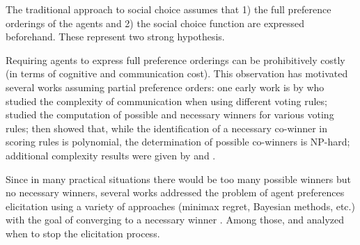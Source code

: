 \documentclass{article}
\begin{document}
The traditional approach to social choice assumes that 1) the full preference orderings of the agents and 2) the social choice function are expressed beforehand. These represent two strong hypothesis.

Requiring agents to express full preference orderings can be prohibitively costly (in terms of cognitive and communication cost).
This observation has motivated several works assuming partial preference orders: 
one early work is  by  who studied the complexity of communication when using different voting rules; %
 studied the computation of possible and necessary winners for various voting rules; %
\citet{Xia2008} then showed that, while the identification of a necessary co-winner in scoring rules is polynomial,  the determination of possible co-winners is NP-hard;
additional complexity results were given by \citet{Walsh2007} and \citet{Pini2007}.

Since in many practical situations there would be too many possible winners but no necessary winners, several works addressed the problem of agent preferences elicitation using a variety of approaches (minimax regret, Bayesian methods, etc.) with the goal of converging to a necessary winner \citep{Naamani-Dery2015,Kalech2011,Lu2011,Pini2009,Benabbou2016,Dey2016,Dey2016_2}. Among those, \citet{Walsh2009} and \citet{Conitzer2009} analyzed when to stop the elicitation process.
\end{document}

